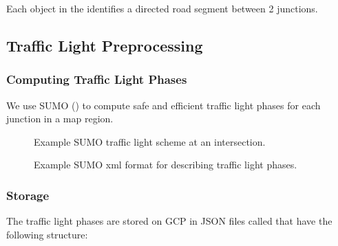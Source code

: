\documentclass[letterpaper,10pt,english]{sphinxmanual}
\begin{document}
Each object in the  identifies a directed road segment between 2 junctions.


\subsection{Traffic Light Preprocessing}
\label{\detokenize{microservices/map_preprocessing/traffic_light_preprocessing:traffic-light-preprocessing}}\label{\detokenize{microservices/map_preprocessing/traffic_light_preprocessing::doc}}

\subsubsection{Computing Traffic Light Phases}
\label{\detokenize{microservices/map_preprocessing/traffic_light_preprocessing:computing-traffic-light-phases}}
We use SUMO () to compute safe and efficient traffic light phases for each junction in a map region.

\begin{figure}[htbp]
\centering
\capstart

\noindent{}
\caption{Example SUMO traffic light scheme at an intersection.}\label{\detokenize{microservices/map_preprocessing/traffic_light_preprocessing:id1}}\end{figure}

\begin{figure}[htbp]
\centering
\capstart

\noindent{}
\caption{Example SUMO xml format for describing traffic light phases.}\label{\detokenize{microservices/map_preprocessing/traffic_light_preprocessing:id2}}\end{figure}


\subsubsection{Storage}
\label{\detokenize{microservices/map_preprocessing/traffic_light_preprocessing:storage}}
The traffic light phases are stored on GCP in JSON files called  that have the following structure:
\end{document}
